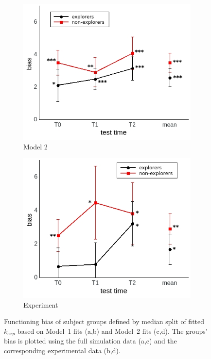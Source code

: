 \documentclass[a4paper]{scrreprt}
\begin{document}
\begin{figure}
\begin{subfigure}[b]{0.49\textwidth}
        \includegraphics[width=\textwidth]{figs/sec3/temp/temp_mod2mod2.jpeg}
        \caption{Model 2}
    \end{subfigure}
    \begin{subfigure}[b]{0.49\textwidth}
        \includegraphics[width=\textwidth]{figs/sec3/temp/temp_mod2dat.jpeg}
        \caption{Experiment}
    \end{subfigure}
\caption{Functioning bias of subject groups defined by median split of fitted $k_{exp}$ based on Model~1 fits (a,b) and Model~2 fits (c,d). The groups' bias is plotted using the full simulation data (a,c) and the corresponding experimental data (b,d).}
\label{fig:temp_median}
\end{figure}
\end{document}
